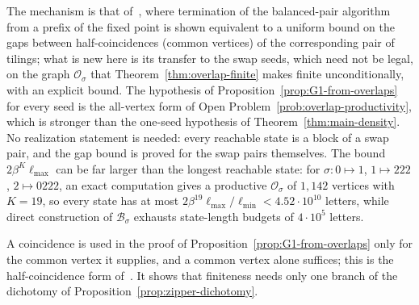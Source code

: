 \documentclass[11pt]{amsart}
\theoremstyle{plain}
\theoremstyle{definition}
\theoremstyle{remark}
\newcommand{\B}{\mathcal{B}}
\begin{document}
The mechanism is that of~\cite[Thm.~5.6]{SS}, where termination of the balanced-pair algorithm from a prefix of the fixed point is shown equivalent to a uniform bound on the gaps between half-coincidences (common vertices) of the corresponding pair of tilings; what is new here is its transfer to the swap seeds, which need not be legal, on the graph $\mathcal O_\sigma$ that Theorem~\ref{thm:overlap-finite} makes finite unconditionally, with an explicit bound. The hypothesis of Proposition~\ref{prop:G1-from-overlaps} for every seed is the all-vertex form of Open Problem~\ref{prob:overlap-productivity}, which is stronger than the one-seed hypothesis of Theorem~\ref{thm:main-density}. No realization statement is needed: every reachable state is a block of a swap pair, and the gap bound is proved for the swap pairs themselves. The bound $2\beta^K\ell_{\max}$ can be far larger than the longest reachable state: for $\sigma\colon0\mapsto1$, $1\mapsto222$, $2\mapsto0222$, an exact computation gives a productive $\mathcal O_\sigma$ of $1{,}142$ vertices with $K=19$, so every state has at most $2\beta^{19}\ell_{\max}/\ell_{\min}<4.52\cdot10^{10}$ letters, while direct construction of $\B_\sigma$ exhausts state-length budgets of $4\cdot10^5$ letters.

A coincidence is used in the proof of Proposition~\ref{prop:G1-from-overlaps} only for the common vertex it supplies, and a common vertex alone suffices; this is the half-coincidence form of~\cite[Thm.~5.6]{SS}. It shows that finiteness needs only one branch of the dichotomy of Proposition~\ref{prop:zipper-dichotomy}.
\end{document}
